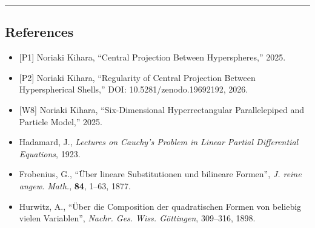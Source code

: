 \documentclass[
  a4paper,11pt]{article}
\providecommand{\tightlist}{%
  \setlength{\itemsep}{0pt}\setlength{\parskip}{0pt}}
\theoremstyle{definition}
\theoremstyle{remark}
\begin{document}
\begin{center}\rule{0.5\linewidth}{0.5pt}\end{center}

\subsection{References}\label{references}

\begin{itemize}
\tightlist
\item
  {[}P1{]} Noriaki Kihara, ``Central Projection Between Hyperspheres,''
  2025.
\item
  {[}P2{]} Noriaki Kihara, ``Regularity of Central Projection Between
  Hyperspherical Shells,'' DOI: 10.5281/zenodo.19692192, 2026.
\item
  {[}W8{]} Noriaki Kihara, ``Six-Dimensional Hyperrectangular
  Parallelepiped and Particle Model,'' 2025.
\item
  Hadamard, J., \emph{Lectures on Cauchy's Problem in Linear Partial
  Differential Equations}, 1923.
\item
  Frobenius, G., ``Über lineare Substitutionen und bilineare Formen'',
  \emph{J. reine angew. Math.}, \textbf{84}, 1--63, 1877.
\item
  Hurwitz, A., ``Über die Composition der quadratischen Formen von
  beliebig vielen Variablen'', \emph{Nachr. Ges. Wiss. Göttingen},
  309--316, 1898.
\end{itemize}
\end{document}
